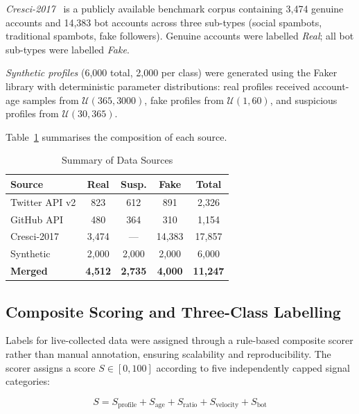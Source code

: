 \documentclass[conference]{IEEEtran}
\begin{document}
\textit{Cresci-2017}~\cite{b10} is a publicly available benchmark
corpus containing 3,474 genuine accounts and 14,383 bot accounts across
three sub-types (social spambots, traditional spambots, fake followers).
Genuine accounts were labelled \textit{Real}; all bot sub-types were
labelled \textit{Fake}.

\textit{Synthetic profiles} (6,000 total, 2,000 per class) were
generated using the Faker library with deterministic parameter
distributions: real profiles received account-age samples from
$\mathcal{U}(365, 3000)$, fake profiles from $\mathcal{U}(1, 60)$, and
suspicious profiles from $\mathcal{U}(30, 365)$.

Table~\ref{tab:datasources} summarises the composition of each source.

\begin{table}[htbp]
  \caption{Summary of Data Sources}
  \label{tab:datasources}
  \begin{center}
    \begin{tabular}{|l|c|c|c|c|}
      \hline
      \textbf{Source} & \textbf{Real} & \textbf{Susp.} & \textbf{Fake} & \textbf{Total} \\
      \hline
      Twitter API v2  & 823  & 612   & 891    & 2,326  \\
      GitHub API      & 480  & 364   & 310    & 1,154  \\
      Cresci-2017     & 3,474 & ---  & 14,383 & 17,857 \\
      Synthetic       & 2,000 & 2,000 & 2,000 & 6,000  \\
      \hline
      \textbf{Merged} & \textbf{4,512} & \textbf{2,735} & \textbf{4,000} & \textbf{11,247} \\
      \hline
    \end{tabular}
  \end{center}
\end{table}

\subsection{Composite Scoring and Three-Class Labelling}

Labels for live-collected data were assigned through a rule-based
composite scorer rather than manual annotation, ensuring scalability
and reproducibility. The scorer assigns a score $S \in [0, 100]$
according to five independently capped signal categories:

\begin{equation}
  S = S_{\text{profile}} + S_{\text{age}} + S_{\text{ratio}}
      + S_{\text{velocity}} + S_{\text{bot}}
  \label{eq:score}
\end{equation}
\end{document}
